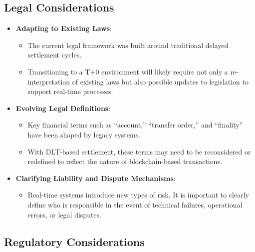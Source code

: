 \documentclass[conference]{IEEEtran}
\begin{document}
\subsection{Legal Considerations}

\begin{itemize}
    \item \textbf{Adapting to Existing Laws}:
    \begin{itemize}
        \item The current legal framework was built around traditional delayed settlement cycles. 
        \item Transitioning to a T+0 environment will likely require not only a re-interpretation of existing laws but also possible updates to legislation to support real-time processes.
    \end{itemize}
    
    \item \textbf{Evolving Legal Definitions}:
    \begin{itemize}
        \item Key financial terms such as ``account,'' ``transfer order,'' and ``finality'' have been shaped by legacy systems. 
        \item With DLT-based settlement, these terms may need to be reconsidered or redefined to reflect the nature of blockchain-based transactions.
    \end{itemize}
    
    \item \textbf{Clarifying Liability and Dispute Mechanisms}:
    \begin{itemize}
        \item Real-time systems introduce new types of risk. It is important to clearly define who is responsible in the event of technical failures, operational errors, or legal disputes.
    \end{itemize}
\end{itemize}

\subsection{Regulatory Considerations}
\end{document}
